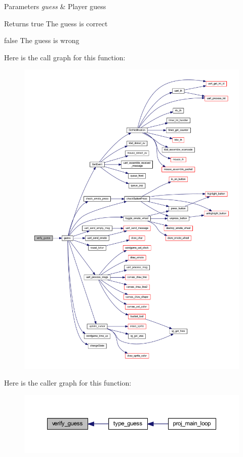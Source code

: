 \begin{DoxyParams}{Parameters}
{\em guess} & Player guess \\
\hline
\end{DoxyParams}
\begin{DoxyReturn}{Returns}
true The guess is correct 

false The guess is wrong 
\end{DoxyReturn}
Here is the call graph for this function\+:
\nopagebreak
\begin{figure}[H]
\begin{center}
\leavevmode
\includegraphics[width=350pt]{group__wordpicker_ga6353a81725e186791f470cbd96c7ec1b_cgraph}
\end{center}
\end{figure}
Here is the caller graph for this function\+:\nopagebreak
\begin{figure}[H]
\begin{center}
\leavevmode
\includegraphics[width=350pt]{group__wordpicker_ga6353a81725e186791f470cbd96c7ec1b_icgraph}
\end{center}
\end{figure}
